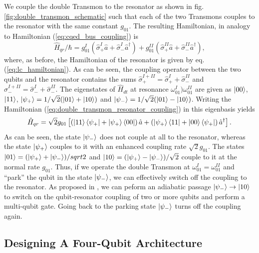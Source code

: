 We couple the double Transmon to the resonator as shown in fig. \ref{fig:double_transmon_schematic} such that each of the two Transmons couples to the resonator with the same constant $g_{01}$. The resulting Hamiltonian, in analogy to Hamiltonian (\ref{eq:cqed_bus_coupling}) is
%
\begin{equation}
\hat{H}_{qr}/\hbar = g_{01}^I\left(\hat{\sigma}_+^I\hat{a}+\hat{\sigma}_-^I\hat{a}^\dagger\right)+g_{01}^{II}\left(\hat{\sigma}_+^{II}\hat{a}+\hat{\sigma}_-^{II}\hat{a}^\dagger \right), \label{eq:double_transmon_resonator_coupling}
\end{equation}
%
where, as before, the Hamiltonian of the resonator is given by eq. (\ref{eq:lc_hamiltonian}). As can be seen, the coupling operator between the two qubits and the resonator contains the sums $\hat{\sigma}_+^{I+II}=\hat{\sigma}_+^I+\hat{\sigma}_-^{II}$ and $\hat{\sigma}_-^{I+II}=\hat{\sigma}_-^I+\hat{\sigma}_-^{II}$. The eigenstates of $\hat{H}_{dt}$ at resonance $\omega_{01}^I)\omega_{01}^{II}$ are given as $\left| 00 \right>$,$\left| 11 \right>$, $\left| \psi_+ \right>=1/\sqrt{2}(\left| 01 \right>+\left| 10 \right>)$ and $\left| \psi_- \right>=1/\sqrt{2}(\left| 01 \right>-\left| 10 \right>)$. Writing the Hamiltonian (\ref{eq:double_transmon_resonator_coupling}) in this eigenbasis yields
%
\begin{equation}
\hat{H}_{qr} = \sqrt{2}g_{01}\left[\left(\left| 11 \right>\left< \psi_+ \right|+\left| \psi_+ \right>\left< 00 \right|\right)\hat{a}+\left(\left| \psi_+ \right>\left< 11 \right|+\left| 00 \right>\left< \psi_+ \right|\right)\hat{a}^\dagger\right].
\end{equation}
%
As can be seen, the state $\left| \psi_- \right>$ does not couple at all to the resonator, whereas the state $\left| \psi_+ \right>$ couples to it with an enhanced coupling rate $\sqrt{2}g_{01}$. The states $\left| 01 \right>=(\left| \psi_+ \right>+\left| \psi_- \right>)/sqrt{2}$ and $\left| 10 \right>=(\left| \psi_+ \right>-\left| \psi_- \right>)/\sqrt{2}$ couple to it at the normal rate $g_{01}$. Thus, if we operate the double Transmon at $\omega_{01}^I=\omega_{01}^{II}$ and ``park'' the qubit in the state $\left| \psi_- \right>$, we can effectively switch off the coupling to the resonator. As proposed in \citep{srinivasan_tunable_2011}, we can peform an adiabatic passage $\left| \psi_- \right>\to\left| 10 \right>$ to switch on the qubit-resonator coupling of two or more qubits and perform a multi-qubit gate. Going back to the parking state $\left| \psi_- \right>$ turns off the coupling again.

\subsection{Designing A Four-Qubit Architecture}

